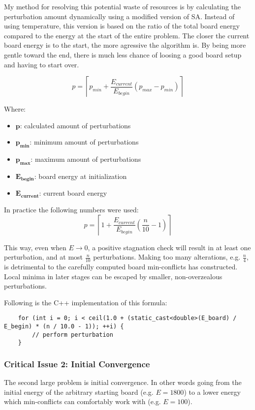 \documentclass{article}
\begin{document}
My method for resolving this potential waste of resources is by calculating the perturbation amount dynamically using a modified version of SA.
Instead of using temperature, this version is based on the ratio of the total board energy compared to the energy at the start of the entire problem.
The closer the current board energy is to the start, the more agressive the algorithm is. By being more gentle toward the end,
there is much less chance of loosing a good board setup and having to start over.

\[
    p = \left\lceil p_{min}+\frac{E_{current}}{E_{begin}} \left(p_{max} - p_{min}\right)\right\rceil
\]

Where:

\begin{itemize}
    \item $\mathbf{p}$: calculated amount of perturbations
    \item $\mathbf{p_{min}}$: minimum amount of perturbations
    \item $\mathbf{p_{max}}$: maximum amount of perturbations
    \item $\mathbf{E_{begin}}$: board energy at initialization
    \item $\mathbf{E_{current}}$: current board energy
\end{itemize}

In practice the following numbers were used:
\[
    p = \left\lceil 1+\frac{E_{current}}{E_{begin}} \left(\frac{n}{10} - 1\right)\right\rceil
\]

This way, even when $E\to0$, a positive stagnation check will result in at least one perturbation, and at most $\frac{n}{10}$ perturbations.
Making too many alterations, e.g. $\frac{n}{4}$, is detrimental to the carefully computed board min-conflicts has constructed.
Local minima in later stages can be escaped by smaller, non-overzealous perturbations.

Following is the C++ implementation of this formula:

\begin{lstlisting}
    for (int i = 0; i < ceil(1.0 + (static_cast<double>(E_board) / E_begin) * (n / 10.0 - 1)); ++i) {
        // perform perturbation
    }
\end{lstlisting}

\subsubsection{Critical Issue 2: Initial Convergence}
The second large problem is initial convergence. In other words going from the initial energy of the arbitrary starting board (e.g. $E=1800$)
to a lower energy which min-conflicts can comfortably work with (e.g. $E=100$).
\end{document}

